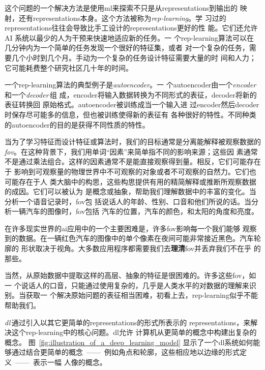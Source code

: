 这个问题的一个解决方法是使用\gls*{ml}来探索不只是从\gls*{representations}到输出的
映射，还有\gls*{representations}本身。这个方法被称为\emph{\gls{rep-learning}}。学
习过的\gls*{representations}往往会导致比手工设计的\gls*{representations}更好的性
能。它们还允许 AI 系统以最少的人为干预来快速地适应新的任务。一
个\gls*{rep-learning}算法可以在几分钟内为一个简单的任务发现一个很好的特征集，或者
对一个复杂的任务，需要几个小时到几个月。手动为一个复杂的任务设计特征需要大量的时
间和人力；它可能耗费整个研究社区几十年的时间。

一个\gls*{rep-learning}算法的典型例子是\emph{\gls{autoencoder}}。一
个\gls*{autoencoder}由一个\emph{\gls{encoder}}\,和一个\emph{\gls{decoder}}\,组
成，\gls*{encoder}将输入数据转换为不同形式的表征，\gls*{decoder}将新的表征转换回
原始格式。\gls*{autoencoder}被训练成当一个输入进
过\gls*{encoder}然后\gls*{decoder}时保存尽可能多的信息，但也被训练使得新的表征有
各种很好的特性。不同种类的\gls*{autoencoder}的目的是获得不同性质的特性。

当为了学习特征而设计特征或算法时，我们的目标通常是分离能解释被观察数据的%
\emph{\gls{fov}}。在这种背景下，我们用单词``因素''来简单指不同的影响来源；这些因
素通常不是通过乘法组合。这样的因素通常不是能直接观察得到量。相反，它们可能存在于
影响到可观察量的物理世界中不可观察的对象或者不可观察的自然力。它们也可能存在于人
类大脑中的构思，这些构思提供有用的精简解释或推断所观察数据的成因。它们可以被认为
是概念或抽象，帮助我们理解数据中的丰富的变化。当分析一个语音记录时，\gls*{fov}包
括说话人的年龄、性别、口音和他们所说的话。当分析一辆汽车的图像时，\gls*{fov}包括
汽车的位置，汽车的颜色，和太阳的角度和亮度。

在许多现实世界的\gls*{ai}应用中的一个主要困难是，许多\gls*{fov}影响每一个我们能够
观察到的数据。在一辆红色汽车的图像中的单个像素在夜间可能非常接近黑色。汽车轮廓的
形状取决于视角。大多数应用程序都需要我们去\textbf{理清}\gls*{fov}并丢弃我们不在乎
的那些。

当然，从原始数据中提取这样的高层、抽象的特征是很困难的。许多这些\gls*{fov}，如一
个说话人的口音，只能通过使用复杂的，几乎是人类水平的对数据的理解来识别。当获取一
个解决原始问题的表征相当困难，初看上去，\gls*{rep-learning}似乎不能帮助我们。

\emph{\gls{dl}}\,通过引入以其它更简单的\gls*{representations}的形式所表示的%
\gls*{representations}，来解决这个\gls*{rep-learning}中的核心问题。\gls*{dl}允许
计算机从更简单的概念中构建出复杂的概念。
图~\ref{fig:illustration_of_a_deep_learning_model} 显示了一个\gls*{dl}系统如何能
够通过结合更简单的概念~——~例如角点和轮廓，这些相应地以边缘的形式定义~——~表示一幅
人像的概念。




